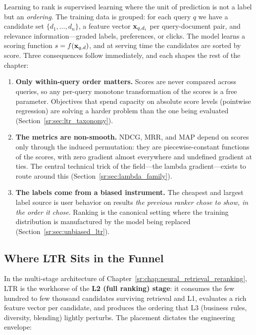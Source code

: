 Learning to rank is supervised learning where the unit of prediction is not a label but an \textit{ordering}. The training data is grouped: for each query $q$ we have a candidate set $\{d_1, \ldots, d_n\}$, a feature vector $\mathbf{x}_{q,d_i}$ per query-document pair, and relevance information---graded labels, preferences, or clicks. The model learns a scoring function $s = f(\mathbf{x}_{q,d})$, and at serving time the candidates are sorted by score. Three consequences follow immediately, and each shapes the rest of the chapter:

\begin{enumerate}
    \item \textbf{Only within-query order matters.} Scores are never compared across queries, so any per-query monotone transformation of the scores is a free parameter. Objectives that spend capacity on absolute score levels (pointwise regression) are solving a harder problem than the one being evaluated (Section~\ref{sr:sec:ltr_taxonomy}).
    \item \textbf{The metrics are non-smooth.} NDCG, MRR, and MAP depend on scores only through the induced permutation: they are piecewise-constant functions of the scores, with zero gradient almost everywhere and undefined gradient at ties. The central technical trick of the field---the lambda gradient---exists to route around this (Section~\ref{sr:sec:lambda_family}).
    \item \textbf{The labels come from a biased instrument.} The cheapest and largest label source is user behavior on results \textit{the previous ranker chose to show, in the order it chose}. Ranking is the canonical setting where the training distribution is manufactured by the model being replaced (Section~\ref{sr:sec:unbiased_ltr}).
\end{enumerate}

\subsection{Where LTR Sits in the Funnel}

In the multi-stage architecture of Chapter~\ref{sr:chap:neural_retrieval_reranking}, LTR is the workhorse of the \textbf{L2 (full ranking) stage}: it consumes the few hundred to few thousand candidates surviving retrieval and L1, evaluates a rich feature vector per candidate, and produces the ordering that L3 (business rules, diversity, blending) lightly perturbs. The placement dictates the engineering envelope:

